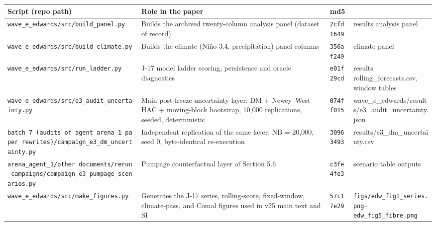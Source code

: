 \documentclass[11pt]{article}
\begin{document}
{\def\LTcaptype{none} %
\begin{longtable}[]{@{}
  >{\raggedright\arraybackslash}p{}
  >{\raggedright\arraybackslash}p{}
  >{\raggedright\arraybackslash}p{}
  >{\raggedright\arraybackslash}p{}@{}}
\toprule\noalign{}
\begin{minipage}[b]{\linewidth}\raggedright
Script (repo path)
\end{minipage} & \begin{minipage}[b]{\linewidth}\raggedright
Role in the paper
\end{minipage} & \begin{minipage}[b]{\linewidth}\raggedright
md5
\end{minipage} & \begin{minipage}[b]{\linewidth}\raggedright
\end{minipage} \\
\midrule\noalign{}
\endhead
\bottomrule\noalign{}
\endlastfoot
\texttt{wave\_e\_edwards/src/build\_panel.py} & Builds the archived
twenty-column analysis panel (dataset of record) & \texttt{2cfd1649} &
results analysis panel \\
\texttt{wave\_e\_edwards/src/build\_climate.py} & Builds the climate
(Niño 3.4, precipitation) panel columns & \texttt{356af249} & climate
panel \\
\texttt{wave\_e\_edwards/src/run\_ladder.py} & J-17 model ladder
scoring, persistence and oracle diagnostics & \texttt{e01f29cd} &
results rolling\_forecasts.csv, window tables \\
\texttt{wave\_e\_edwards/src/e3\_audit\_uncertainty.py} & Main
post-freeze uncertainty layer: DM + Newey--West HAC + moving-block
bootstrap, 10,000 replications, seeded, deterministic &
\texttt{074ff015} &
wave\_e\_edwards/results/e3\_audit\_uncertainty.json \\
\texttt{batch\ 7\ (audits\ of\ agent\ arena\ 1\ paper\ rewrites)/campaign\_e3\_dm\_uncertainty.py}
& Independent replication of the same layer: NB = 20,000, seed 0,
byte-identical re-execution & \texttt{30963493} &
results/e3\_dm\_uncertainty.csv \\
\texttt{arena\_agent\_1/other\ documents/rerun\_campaigns/campaign\_e3\_pumpage\_scenarios.py}
& Pumpage counterfactual layer of Section 5.6 & \texttt{c3fe4fe3} &
scenario table outputs \\
\texttt{wave\_e\_edwards/src/make\_figures.py} & Generates the J-17 series, rolling-score, fixed-window, climate-pass, and Comal figures used in v25 main text and SI & \texttt{57c17e29} & \texttt{figs/edw\_fig1\_series.png}--\texttt{edw\_fig5\_fibre.png} \\
\end{longtable}
}
\end{document}
